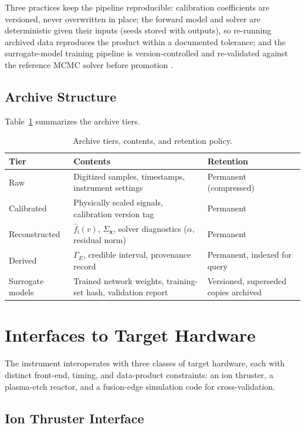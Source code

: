 Three practices keep the pipeline reproducible: calibration coefficients are versioned, never overwritten in place; the forward model and solver are deterministic given their inputs (seeds stored with outputs), so re-running archived data reproduces the product within a documented tolerance; and the surrogate-model training pipeline is version-controlled and re-validated against the reference MCMC solver before promotion \cite{ref0731}.

\subsection{Archive Structure}

Table~\ref{tab:data-hierarchy} summarizes the archive tiers.

\begin{table}[htbp]
\centering
\caption{Archive tiers, contents, and retention policy.}
\label{tab:data-hierarchy}
\begin{tabularx}{\textwidth}{@{}l X l@{}}
\toprule
Tier & Contents & Retention \\
\midrule
Raw & Digitized samples, timestamps, instrument settings & Permanent (compressed) \\
Calibrated & Physically scaled signals, calibration version tag & Permanent \\
Reconstructed & $\hat f_{\mathrm{i}}(v)$, $\Sigma_{\mathbf{x}}$, solver diagnostics ($\alpha$, residual norm) & Permanent \\
Derived & $\Gamma_{E}$, credible interval, provenance record & Permanent, indexed for query \\
Surrogate models & Trained network weights, training-set hash, validation report & Versioned, superseded copies archived \\
\bottomrule
\end{tabularx}
\end{table}

\section{Interfaces to Target Hardware}
\label{sec:interfaces}

The instrument interoperates with three classes of target hardware, each with distinct front-end, timing, and data-product constraints: an ion thruster, a plasma-etch reactor, and a fusion-edge simulation code for cross-validation.

\subsection{Ion Thruster Interface}

